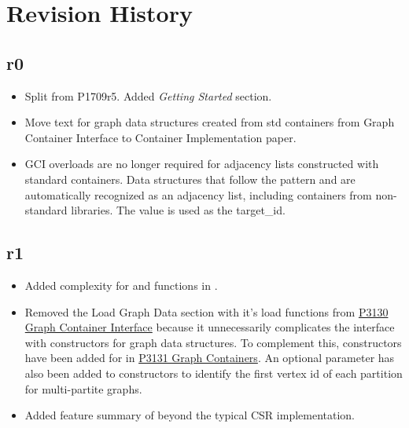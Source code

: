 \section{Revision History}

\subsection*{\paperno r0}

\begin{itemize}
      \item Split from P1709r5. Added \textit{Getting Started} section.
      \item Move text for graph data structures created from std containers from Graph Container Interface to 
            Container Implementation paper.
      \item GCI overloads are no longer required for adjacency lists constructed with standard containers. Data structures that follow
            the pattern  and 
            are automatically recognized as an adjacency list, including containers from non-standard libraries. The 
            value is used as the target\_id.
\end{itemize}

\subsection*{\paperno r1}
\begin{itemize}
      \item Added complexity for  and  functions in .
      \item Removed the Load Graph Data section with it's load functions from \href{https://www.wg21.link/P3130}{P3130 Graph Container Interface}
            because it unnecessarily complicates the interface with constructors for graph data structures. To complement this, constructors have 
            been added for  in \href{https://www.wg21.link/P3131}{P3131 Graph Containers}. An optional  
            parameter has also been added to constructors to identify the first vertex id of each partition for multi-partite graphs.
      \item Added feature summary of  beyond the typical CSR implementation.
\end{itemize}
